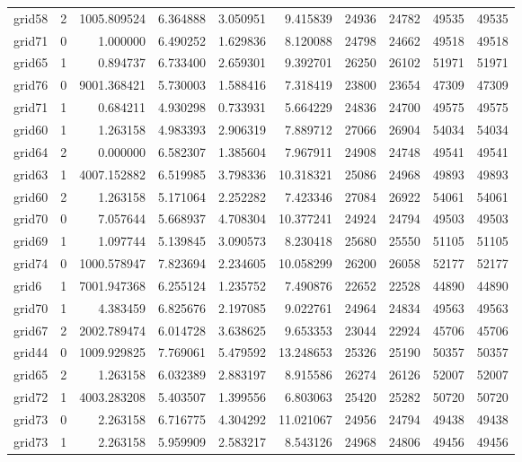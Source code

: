 \begin{longtable}{|l|r|r|r|r|r|r|r|r|r|}
grid58 & 2 & 1005.809524 & 6.364888 & 3.050951 & 9.415839 & 24936 & 24782 & 49535 & 49535 \\
grid71 & 0 & 1.000000 & 6.490252 & 1.629836 & 8.120088 & 24798 & 24662 & 49518 & 49518 \\
grid65 & 1 & 0.894737 & 6.733400 & 2.659301 & 9.392701 & 26250 & 26102 & 51971 & 51971 \\
grid76 & 0 & 9001.368421 & 5.730003 & 1.588416 & 7.318419 & 23800 & 23654 & 47309 & 47309 \\
grid71 & 1 & 0.684211 & 4.930298 & 0.733931 & 5.664229 & 24836 & 24700 & 49575 & 49575 \\
grid60 & 1 & 1.263158 & 4.983393 & 2.906319 & 7.889712 & 27066 & 26904 & 54034 & 54034 \\
grid64 & 2 & 0.000000 & 6.582307 & 1.385604 & 7.967911 & 24908 & 24748 & 49541 & 49541 \\
grid63 & 1 & 4007.152882 & 6.519985 & 3.798336 & 10.318321 & 25086 & 24968 & 49893 & 49893 \\
grid60 & 2 & 1.263158 & 5.171064 & 2.252282 & 7.423346 & 27084 & 26922 & 54061 & 54061 \\
grid70 & 0 & 7.057644 & 5.668937 & 4.708304 & 10.377241 & 24924 & 24794 & 49503 & 49503 \\
grid69 & 1 & 1.097744 & 5.139845 & 3.090573 & 8.230418 & 25680 & 25550 & 51105 & 51105 \\
grid74 & 0 & 1000.578947 & 7.823694 & 2.234605 & 10.058299 & 26200 & 26058 & 52177 & 52177 \\
grid6 & 1 & 7001.947368 & 6.255124 & 1.235752 & 7.490876 & 22652 & 22528 & 44890 & 44890 \\
grid70 & 1 & 4.383459 & 6.825676 & 2.197085 & 9.022761 & 24964 & 24834 & 49563 & 49563 \\
grid67 & 2 & 2002.789474 & 6.014728 & 3.638625 & 9.653353 & 23044 & 22924 & 45706 & 45706 \\
grid44 & 0 & 1009.929825 & 7.769061 & 5.479592 & 13.248653 & 25326 & 25190 & 50357 & 50357 \\
grid65 & 2 & 1.263158 & 6.032389 & 2.883197 & 8.915586 & 26274 & 26126 & 52007 & 52007 \\
grid72 & 1 & 4003.283208 & 5.403507 & 1.399556 & 6.803063 & 25420 & 25282 & 50720 & 50720 \\
grid73 & 0 & 2.263158 & 6.716775 & 4.304292 & 11.021067 & 24956 & 24794 & 49438 & 49438 \\
grid73 & 1 & 2.263158 & 5.959909 & 2.583217 & 8.543126 & 24968 & 24806 & 49456 & 49456 \\

\end{longtable}
